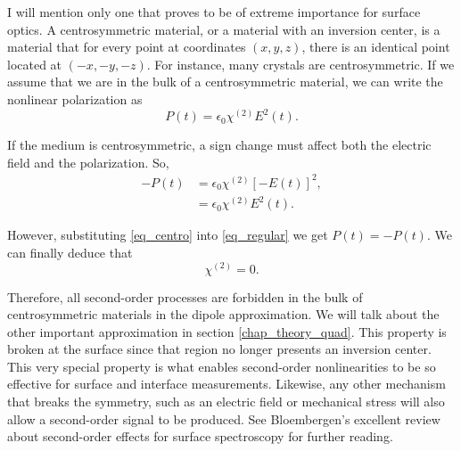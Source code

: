 I will mention only one that proves to be of extreme importance for surface optics. A centrosymmetric material, or a material with an inversion center, is a material that for every point at coordinates $(x,y,z)$, there is an identical point located at $(-x,-y,-z)$. For instance, many crystals are centrosymmetric. If we assume that we are in the bulk of a centrosymmetric material, we can write the nonlinear polarization as
\begin{equation}
{P}(t) = \epsilon_{0}\chi^{(2)}{E}^{2}(t).\label{eq_regular}
\end{equation}

If the medium is centrosymmetric, a sign change must affect both the electric field and the polarization. So,
\begin{align}
-{P}(t) &= \epsilon_{0}\chi^{(2)}\left[-{E}(t)\right]^{2},\\
			  &= \epsilon_{0}\chi^{(2)}{E}^{2}(t).\label{eq_centro}
\end{align}

However, substituting \eqref{eq_centro} into \eqref{eq_regular} we get ${P}(t) = -{P}(t)$. We can finally deduce that
\begin{equation}
\chi^{(2)} = 0.
\end{equation}

Therefore, all second-order processes are forbidden in the bulk of centrosymmetric materials in the dipole approximation. We will talk about the other important approximation in section \ref{chap_theory_quad}. This property is broken at the surface since that region no longer presents an inversion center.  This very special property is what enables second-order nonlinearities to be so effective for surface and interface measurements. Likewise, any other mechanism that breaks the symmetry, such as an electric field or mechanical stress will also allow a second-order signal to be produced. See Bloembergen's \cite{bloembergen1999surface} excellent review about second-order effects for surface spectroscopy for further reading. 

